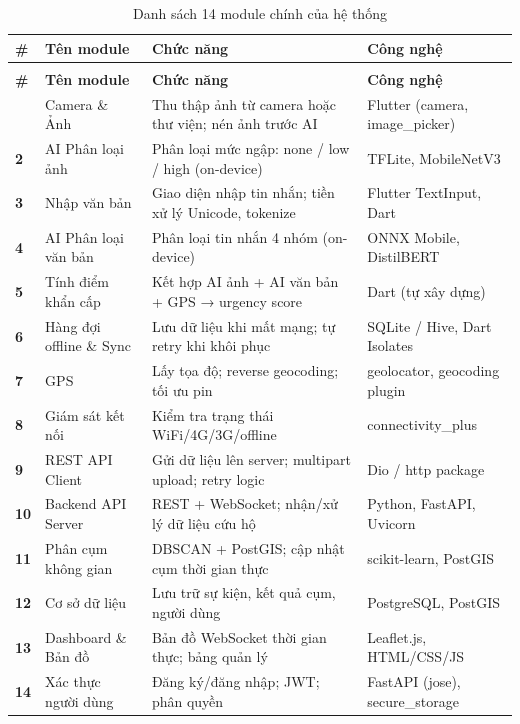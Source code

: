 \documentclass[12pt, a4paper]{report}
\begin{document}
\begin{longtable}{>{\bfseries}p{0.5cm} p{3.2cm} p{5.5cm} p{4.8cm}}
\caption{Danh sách 14 module chính của hệ thống}
\label{tab:modules}\\
\toprule
\textbf{\#} & \textbf{Tên module} & \textbf{Chức năng} & \textbf{Công nghệ} \\
\midrule
\endfirsthead
\multicolumn{4}{c}{\tablename~\thetable\ -- tiếp theo}\\
\toprule
\textbf{\#} & \textbf{Tên module} & \textbf{Chức năng} & \textbf{Công nghệ} \\
\midrule
\endhead
\bottomrule
\endfoot
\bottomrule
\endlastfoot
1 & Camera \& Ảnh & Thu thập ảnh từ camera hoặc thư viện; nén ảnh trước AI & Flutter (camera, image\_picker) \\
2 & AI Phân loại ảnh & Phân loại mức ngập: none / low / high (on-device) & TFLite, MobileNetV3 \\
3 & Nhập văn bản & Giao diện nhập tin nhắn; tiền xử lý Unicode, tokenize & Flutter TextInput, Dart \\
4 & AI Phân loại văn bản & Phân loại tin nhắn 4 nhóm (on-device) & ONNX Mobile, DistilBERT \\
5 & Tính điểm khẩn cấp & Kết hợp AI ảnh + AI văn bản + GPS → urgency score & Dart (tự xây dựng) \\
6 & Hàng đợi offline \& Sync & Lưu dữ liệu khi mất mạng; tự retry khi khôi phục & SQLite / Hive, Dart Isolates \\
7 & GPS & Lấy tọa độ; reverse geocoding; tối ưu pin & geolocator, geocoding plugin \\
8 & Giám sát kết nối & Kiểm tra trạng thái WiFi/4G/3G/offline & connectivity\_plus \\
9 & REST API Client & Gửi dữ liệu lên server; multipart upload; retry logic & Dio / http package \\
10 & Backend API Server & REST + WebSocket; nhận/xử lý dữ liệu cứu hộ & Python, FastAPI, Uvicorn \\
11 & Phân cụm không gian & DBSCAN + PostGIS; cập nhật cụm thời gian thực & scikit-learn, PostGIS \\
12 & Cơ sở dữ liệu & Lưu trữ sự kiện, kết quả cụm, người dùng & PostgreSQL, PostGIS \\
13 & Dashboard \& Bản đồ & Bản đồ WebSocket thời gian thực; bảng quản lý & Leaflet.js, HTML/CSS/JS \\
14 & Xác thực người dùng & Đăng ký/đăng nhập; JWT; phân quyền & FastAPI (jose), secure\_storage \\
\end{longtable}
\end{document}
